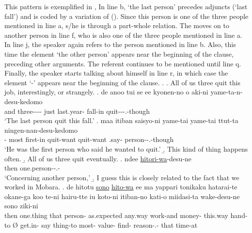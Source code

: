 This pattern is exemplified in \Next,
In line b,  `the last person' precedes adjuncts (`last fall') and is coded by a variation of  ().
Since this person is one of the three people mentioned in line a,
s/he is 
through a part-whole relation.
The  moves on to another person in line f, who is also one of the three people mentioned in line a.
In line j, the speaker again refers to the person mentioned in line b.
Also, this time the element  `the other person' appears near the beginning of the clause, preceding other arguments.
The referent continues to be mentioned until line q.
Finally, the speaker starts talking about himself in line r,
in which case the element  `-' appears near the beginning of the clause.
%
\ex.
 \a. All of us three quit this job, interestingly, or strangely.
 \bg. de anoo  tui se ee kyonen-no o aki-ni yame-ta-n-desu-kedomo \\
 	and  three---- just   last.year-  fall-in quit---.-though \\
	`The last person quit this fall.'
 \bg.  maa itiban saisyo-ni yame-tai yame-tai ttut-ta ningen-nan-desu-kedomo \\
 		-  most first-in quit-want quit-want .say- person--.-though \\
		`He was the first person who said he wanted to quit.'
 \b. This kind of thing happens often.
 \b. All of us three quit eventually.
 \bg. ndee \ul{hitori-wa}-desu-ne \\
 		then one.person--.- \\
		`Concerning another person,'
 \b. I guess this is closely related to the fact that we worked in Mobara.
 \bg. de hitotu \ul{sono} \ul{hito-wa} ee ma yappari tonikaku hatarai-te okane-ga koo te-ni \EM{\O} hairu-tte iu koto-ni itiban-no kati-o miidasi-ta wake-desu-ne sono ziki-ni \\
 		then one.thing that person- \ab{fl}  as.expected any.way work-and money- this.way hand-to {\O} get.in- say thing-to most- value- find- reason-.- that time-at \\
